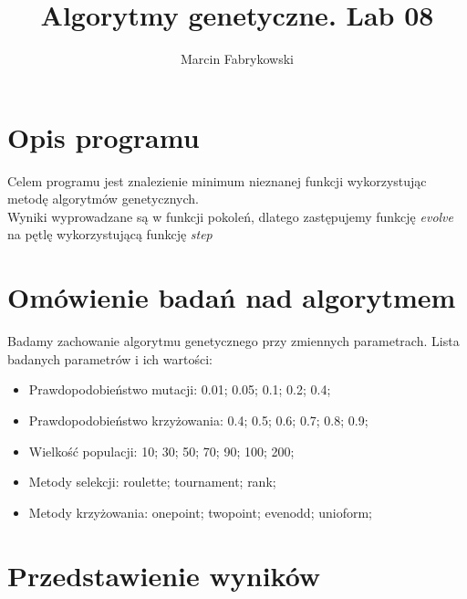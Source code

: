 \documentclass[a4,12pt]{article}
\title{Algorytmy genetyczne. Lab 08}
\author{Marcin Fabrykowski}
\date{}
\begin{document}
\maketitle
\newpage
\section{Opis programu}
Celem programu jest znalezienie minimum nieznanej funkcji wykorzystując metodę algorytmów genetycznych.\\
Wyniki wyprowadzane są w funkcji pokoleń, dlatego zastępujemy funkcję \textit{evolve} na pętlę wykorzystującą funkcję \textit{step}
\section{Omówienie badań nad algorytmem}
Badamy zachowanie algorytmu genetycznego przy zmiennych parametrach. Lista badanych parametrów i ich wartości:
\begin{itemize}
\item Prawdopodobieństwo mutacji: 0.01; 0.05; 0.1; 0.2; 0.4;
\item Prawdopodobieństwo krzyżowania: 0.4; 0.5; 0.6; 0.7; 0.8; 0.9;
\item Wielkość populacji: 10; 30; 50; 70; 90; 100; 200;
\item Metody selekcji: roulette; tournament; rank;
\item Metody krzyżowania: onepoint; twopoint; evenodd; unioform;
\end{itemize}
\section{Przedstawienie wyników}
\end{document}
